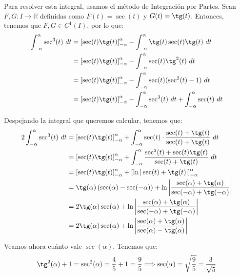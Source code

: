 \begin{ejercicio}
\begin{enumerate}
\begin{description}
            Para resolver esta integral, usamos el método de Integración por Partes.
            Sean $F,G:I\to\mathbb{R}$ definidas como $F(t)=\sec(t)$ y $G(t)=\tg(t)$. Entonces, tenemos que $F,G\in C^1(I)$, por lo que:
            \begin{align*}
                \int_{-\alpha}^{\alpha} \sec^3(t)~dt
                &= \left[ \sec(t)\tg(t) \right]_{-\alpha}^{\alpha} - \int_{-\alpha}^{\alpha} \tg(t)\sec(t)\tg(t)~dt \\
                &= \left[ \sec(t)\tg(t) \right]_{-\alpha}^{\alpha} - \int_{-\alpha}^{\alpha} \sec(t)\tg^2(t)~dt \\
                &= \left[ \sec(t)\tg(t) \right]_{-\alpha}^{\alpha} - \int_{-\alpha}^{\alpha} \sec(t)(\sec^2(t)-1)~dt \\
                &= \left[ \sec(t)\tg(t) \right]_{-\alpha}^{\alpha} - \int_{-\alpha}^{\alpha} \sec^3(t)~dt + \int_{-\alpha}^{\alpha} \sec(t)~dt
            \end{align*}

            Despejando la integral que queremos calcular, tenemos que:
            \begin{align*}
                2\int_{-\alpha}^{\alpha} \sec^3(t)~dt
                &= \left[ \sec(t)\tg(t) \right]_{-\alpha}^{\alpha} + \int_{-\alpha}^{\alpha} \sec(t)\cdot \frac{\sec(t)+\tg(t)}{\sec(t)+\tg(t)}~dt \\
                &= \left[ \sec(t)\tg(t) \right]_{-\alpha}^{\alpha} + \int_{-\alpha}^{\alpha} \frac{\sec^2(t)+\sec(t)\tg(t)}{\sec(t)+\tg(t)}~dt \\
                &= \left[ \sec(t)\tg(t) \right]_{-\alpha}^{\alpha} + \left[ \ln|\sec(t)+\tg(t)| \right]_{-\alpha}^{\alpha} \\
                &= \tg(\alpha) \left(\sec(\alpha)-\sec(-\alpha)\right) +  \ln\left|\dfrac{\sec(\alpha)+\tg(\alpha)}{\sec(-\alpha)+\tg(-\alpha)}\right| \\
                &= 2\tg(\alpha)\sec(\alpha) + \ln\left|\dfrac{\sec(\alpha)+\tg(\alpha)}{\sec(-\alpha)+\tg(-\alpha)}\right| \\
                &= 2\tg(\alpha)\sec(\alpha) + \ln\left|\dfrac{\sec(\alpha)+\tg(\alpha)}{\sec(\alpha)-\tg(\alpha)}\right|
            \end{align*}

            Veamos ahora cuánto vale $\sec(\alpha)$. Tenemos que:
            \begin{equation*}
                \tg^2(\alpha) + 1 = \sec^2(\alpha) = \frac{4}{5} + 1 = \frac{9}{5}
                \Longrightarrow \sec(\alpha) = \sqrt{\frac{9}{5}} = \frac{3}{\sqrt{5}}
            \end{equation*}
            

\end{description}
\end{enumerate}
\end{ejercicio}
